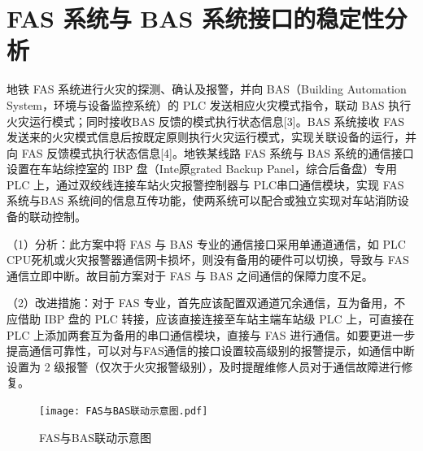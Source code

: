 \section{FAS 系统与 BAS 系统接口的稳定性分析}
地铁 FAS 系统进行火灾的探测、确认及报警，并向 BAS（Building Automation System，环境与设备监控系统）的 PLC 发送相应火灾模式指令，联动 BAS 执行火灾运行模式；同时接收BAS 反馈的模式执行状态信息[3]。BAS 系统接收 FAS 发送来的火灾模式信息后按既定原则执行火灾运行模式，实现关联设备的运行，并向 FAS 反馈模式执行状态信息[4]。地铁某线路 FAS 系统与 BAS 系统的通信接口设置在车站综控室的 IBP 盘（Inte原grated Backup Panel，综合后备盘）专用 PLC 上，通过双绞线连接车站火灾报警控制器与 PLC串口通信模块，实现 FAS 系统与BAS 系统间的信息互传功能，使两系统可以配合或独立实现对车站消防设备的联动控制。\par 
（1）分析：此方案中将 FAS 与 BAS 专业的通信接口采用单通道通信，如 PLC CPU死机或火灾报警器通信网卡损坏，则没有备用的硬件可以切换，导致与 FAS 通信立即中断。故目前方案对于 FAS 与 BAS 之间通信的保障力度不足。\par 
（2）改进措施：对于 FAS 专业，首先应该配置双通道冗余通信，互为备用，不应借助 IBP 盘的 PLC 转接，应该直接连接至车站主端车站级 PLC 上，可直接在 PLC 上添加两套互为备用的串口通信模块，直接与 FAS 进行通信。如要更进一步提高通信可靠性，可以对与FAS通信的接口设置较高级别的报警提示，如通信中断设置为 2 级报警（仅次于火灾报警级别），及时提醒维修人员对于通信故障进行修复。

\begin{figure}[h]
	\centering
	\texttt{[image: FAS与BAS联动示意图.pdf]}
	\caption{FAS与BAS联动示意图}
	\label{FAS与BAS联动示意图}
\end{figure}

